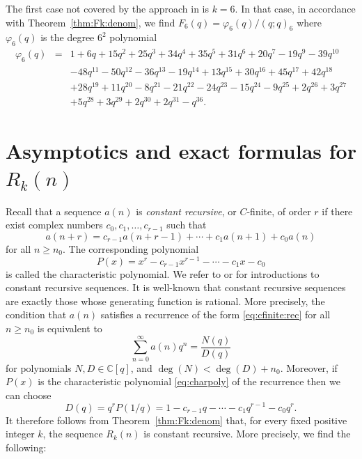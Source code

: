 \documentclass[11pt]{article}
\theoremstyle{plain}
\theoremstyle{definition}
\begin{document}
\begin{example}
  The first case not covered by the approach in \cite{sharan-rook} is $k =
  6$. In that case, in accordance with Theorem~\ref{thm:Fk:denom}, we find
  $F_6 (q) = \varphi_6 (q) / (q ; q)_6$ where $\varphi_6 (q)$ is the degree
  $6^2$ polynomial
  \begin{eqnarray*}
    \varphi_6 (q) & = & 1 + 6 q + 15 q^2 + 25 q^3 + 34 q^4 + 35 q^5 + 31 q^6 +
    20 q^7 - 19 q^9 - 39 q^{10}\\
    &  & - 48 q^{11} - 50 q^{12} - 36 q^{13} - 19 q^{14} + 13 q^{15} + 30
    q^{16} + 45 q^{17} + 42 q^{18}\\
    &  & + 28 q^{19} + 11 q^{20} - 8 q^{21} - 21 q^{22} - 24 q^{23} - 15
    q^{24} - 9 q^{25} + 2 q^{26} + 3 q^{27}\\
    &  & + 5 q^{28} + 3 q^{29} + 2 q^{30} + 2 q^{31} - q^{36} .
  \end{eqnarray*}
\end{example}

\section{Asymptotics and exact formulas for \texorpdfstring{$R_k (n)$}{Rk(n)}}\label{sec:Rk:formulas}

Recall that a sequence $a (n)$ is \emph{constant recursive}, or $C$-finite,
of order $r$ if there exist complex numbers $c_0, c_1, \ldots, c_{r - 1}$ such
that
\begin{equation}
  a (n + r) = c_{r - 1} a (n + r - 1) + \cdots + c_1 a (n + 1) + c_0 a (n)
  \label{eq:cfinite:rec}
\end{equation}
for all $n \geq n_0$. The corresponding polynomial
\begin{equation}
  P (x) = x^r - c_{r - 1} x^{r - 1} - \cdots - c_1 x - c_0 \label{eq:charpoly}
\end{equation}
is called the characteristic polynomial. We refer to \cite{epsw-rec} or
\cite[Chapter~4]{kauers-paule-ct} for introductions to constant recursive
sequences. It is well-known that constant recursive sequences are exactly
those whose generating function is rational. More precisely, the condition
that $a (n)$ satisfies a recurrence of the form \eqref{eq:cfinite:rec} for all
$n \geq n_0$ is equivalent to
\begin{equation}
  \sum_{n = 0}^{\infty} a (n) q^n = \frac{N (q)}{D (q)} \label{eq:cfinite:rat}
\end{equation}
for polynomials $N, D \in \mathbb{C} [q]$, and $\deg (N) < \deg (D) + n_0$.
Moreover, if $P (x)$ is the characteristic polynomial \eqref{eq:charpoly} of
the recurrence then we can choose
\begin{equation*}
  D (q) = q^r P (1 / q) = 1 - c_{r - 1} q - \cdots - c_1 q^{r - 1} - c_0 q^r
   .
\end{equation*}
It therefore follows from Theorem~\ref{thm:Fk:denom} that, for every fixed
positive integer $k$, the sequence $R_k (n)$ is constant recursive. More
precisely, we find the following:
\end{document}
